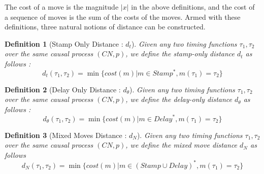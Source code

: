 \documentclass[conference]{IEEEtran}
\newtheorem{definition}{Definition}
\begin{document}
The cost of a move is the magnitude $|x|$ in the above definitions, and the cost of a sequence of moves is the sum of the costs of the moves. Armed with these definitions, three natural notions of distance can be constructed. 
	
	\begin{definition}[Stamp Only Distance : $d_t$]
		Given any two timing functions $\tau_1, \tau_2$ over the same causal process $(CN, p)$, we define the stamp-only distance $d_t$ as follows : 
		\small	$$d_t(\tau_1, \tau_2) = \min \{cost(m) | {m \in Stamp^*}, {m(\tau_1) = \tau_2}\}$$
	\end{definition}
	
	\begin{definition}[Delay Only Distance : $d_\theta$]
		Given any two timing functions $\tau_1, \tau_2$ over the same causal process $(CN, p)$, we define the delay-only distance $d_\theta$ as follows : 
		\small	$$d_\theta(\tau_1, \tau_2) = \min \{cost(m) | {m \in Delay^*}, {m(\tau_1) = \tau_2}\}$$
	\end{definition}
	
	\begin{definition}[Mixed Moves Distance : $d_N$]
		Given any two timing functions $\tau_1, \tau_2$ over the same causal process $(CN, p)$, we define the mixed move distance $d_N$ as follows 
		\small	$$d_N(\tau_1, \tau_2) = \min \{cost(m) | {m \in (Stamp \cup Delay)^*}, {m(\tau_1) = \tau_2}\}$$
		
	\end{definition} 
	
\end{document}
